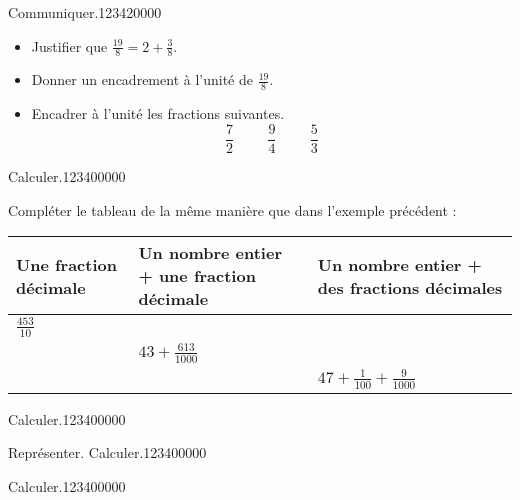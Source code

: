 \begin{pageAD} 
 

 
  
\begin{ExoCad}{Communiquer.}{1234}{2}{0}{0}{0}{0}

 \begin{itemize}
 \item Justifier que $\frac{19}{8}=2+\frac{3}{8}$.
 \item Donner un encadrement à l'unité de $\frac{19}{8}$.
 \item Encadrer à l'unité les fractions suivantes.
 \[\frac{7}{2}\hspace{1cm}\frac{9}{4}\hspace{1cm}\frac{5}{3}\]
 \end{itemize}
 
\end{ExoCad}


\begin{ExoCad}{Calculer.}{1234}{0}{0}{0}{0}{0}


 Compléter le tableau de la même manière que dans l'exemple précédent :
 \begin{center}
 \begin{tabular}{M{5cm}|M{5cm}|M{5cm}}
 Une fraction décimale & Un nombre entier + une fraction décimale & Un nombre entier + des fractions décimales \\\hline\hline
 $\frac{453}{10}$ & & \\\hline
  & $43+\frac{613}{1000}$ & \\\hline
 & & $47+\frac{1}{100}+\frac{9}{1000}$ \\
 \end{tabular}
 \end{center}

 
\end{ExoCad}

\begin{ExoCad}{Calculer.}{1234}{0}{0}{0}{0}{0}

 
\end{ExoCad}



\begin{ExoCad}{Représenter. Calculer.}{1234}{0}{0}{0}{0}{0}

 
 
\end{ExoCad}

\begin{ExoCad}{Calculer.}{1234}{0}{0}{0}{0}{0}

 
\end{ExoCad}

 
\end{pageAD}


